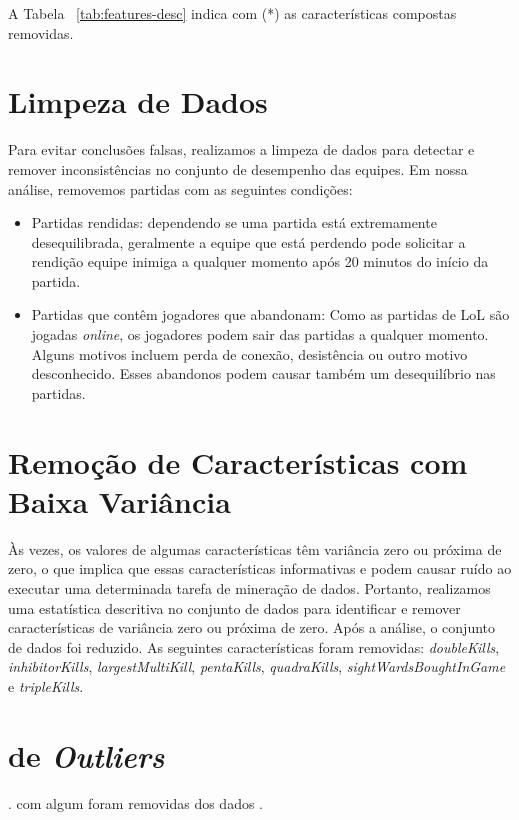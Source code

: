 A Tabela ~\ref{tab:features-desc} indica com (*) as características compostas removidas.

\section{Limpeza de Dados}
Para evitar conclusões falsas, realizamos a limpeza de dados para detectar e remover inconsistências no conjunto de desempenho das equipes. Em nossa análise, removemos partidas com as seguintes condições:

\begin{itemize}
\item Partidas rendidas: dependendo se uma partida está extremamente desequilibrada, geralmente a equipe que está perdendo pode solicitar a rendição  equipe inimiga a qualquer momento após 20 minutos do início da partida.
\item Partidas que contêm jogadores que abandonam: Como as partidas de LoL são jogadas \textit{online}, os jogadores podem sair das partidas a qualquer momento. Alguns motivos incluem perda de conexão, desistência ou outro motivo desconhecido. Esses abandonos podem causar também um desequilíbrio nas partidas.
\end{itemize}

\section{Remoção de Características com Baixa Variância}
Às vezes, os valores de algumas características têm variância zero ou próxima de zero, o que implica que essas características  informativas e podem causar ruído ao executar uma determinada tarefa de mineração de dados. Portanto, realizamos uma estatística descritiva no conjunto de dados para identificar e remover características de variância zero ou próxima de zero. Após a análise, o conjunto de dados foi reduzido. As seguintes características foram removidas: \textit{doubleKills}, \textit{inhibitorKills}, \textit {largestMultiKill}, \textit{pentaKills}, \textit {quadraKills}, \textit {sightWardsBoughtInGame} e \textit{tripleKills}.

\section{ de \textit{Outliers}}
.   com algum   foram removidas dos dados . 

